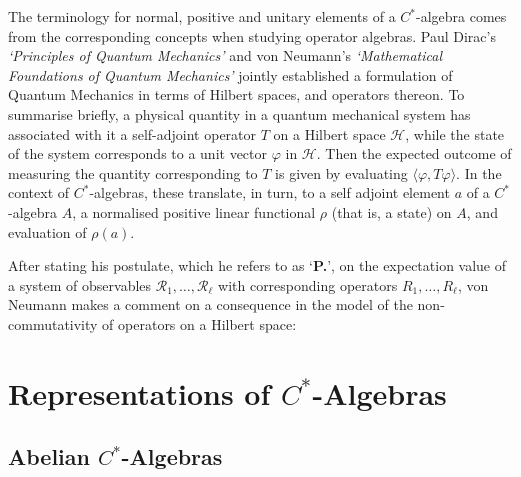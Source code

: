 \documentclass[11pt,a4paper]{report}
\theoremstyle{plain}
\theoremstyle{definition}
\newcommand{\1}{\mathbbm{1}}
\renewcommand{\H}{\mathcal{H}}
\renewcommand{\phi}{\varphi}
\begin{document}
The terminology for normal, positive and unitary elements of a $C^\ast$-algebra 
comes from the corresponding concepts when studying operator algebras. 
Paul Dirac's \emph{`Principles of Quantum Mechanics'} \cite{dirac} and von 
Neumann's \emph{`Mathematical Foundations of Quantum Mechanics'} 
\cite{vonneumann32} jointly established a formulation of Quantum Mechanics in 
terms of Hilbert spaces, and operators thereon. To summarise briefly, a physical 
quantity in a quantum mechanical system has associated with it a self-adjoint 
operator $T$ on a Hilbert space $\H$,  while the state of the system corresponds 
to a unit vector $\phi$ in $\H$. Then the expected outcome of measuring the 
quantity corresponding to $T$ is given by evaluating $\langle\phi, 
T\phi\rangle$. In the context of $C^\ast$-algebras, these translate, in turn, to 
a self adjoint element $a$ of a $C^\ast$-algebra $A$, a normalised positive 
linear functional $\rho$ (that is, a state) on $A$, and evaluation of $\rho(a)$.


After stating his postulate, which he refers to as `\textbf{P.}', on the 
expectation value of a system of observables 
$\mathscr{R_1},\dots,\mathscr{R_\ell}$ with corresponding operators $R_1,\dots, 
R_\ell$, von Neumann makes a comment on a consequence in the model of the 
non-commutativity of operators on a Hilbert space:





\chapter{Representations of $C^\ast$-Algebras}
\section{Abelian $C^\ast$-Algebras}\label{section:abelian}
\end{document}
